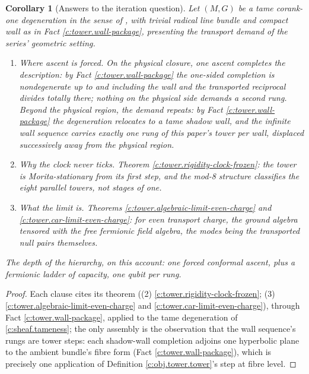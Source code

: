 \documentclass[11pt]{article}
\newtheorem{corollary}[theorem]{Corollary}
\theoremstyle{definition}
\theoremstyle{plain}
\newcommand{\changedmark}[2]{\marginpar{\raggedright\scriptsize\color{#1}#2}}
\begin{document}
\begin{corollary}[Answers to the iteration question]\label{c:tower.answers-iteration-question}
\changedmark{gray}{reworded}
Let $(M, G)$ be a tame corank-one degeneration in the sense of \cite[Hyp.~2.1]{ButlerT4}, with trivial radical line bundle and compact wall as in Fact \ref{c:tower.wall-package}, presenting the transport demand of the series' geometric setting.
\begin{enumerate}
\item \emph{Where ascent is forced.} On the physical closure, one ascent completes the description: by Fact \ref{c:tower.wall-package} the one-sided completion is nondegenerate up to and including the wall and the transported reciprocal divides totally there; nothing on the physical side demands a second rung. Beyond the physical region, the demand repeats: by Fact \ref{c:tower.wall-package} the degeneration relocates to a tame shadow wall, and the infinite wall sequence carries exactly one rung of this paper's tower per wall, displaced successively away from the physical region.
\item \emph{Why the clock never ticks.} Theorem \ref{c:tower.rigidity-clock-frozen}: the tower is Morita-stationary from its first step, and the mod-8 structure classifies the eight parallel towers, not stages of one.
\item \emph{What the limit is.} Theorems \ref{c:tower.algebraic-limit-even-charge} and \ref{c:tower.car-limit-even-charge}: for even transport charge, the ground algebra tensored with the free fermionic field algebra, the modes being the transported null pairs themselves.
\end{enumerate}
The depth of the hierarchy, on this account: one forced conformal ascent, plus a fermionic ladder of capacity, one qubit per rung.
\end{corollary}
\begin{proof}
Each clause cites its theorem ((2) \ref{c:tower.rigidity-clock-frozen}; (3) \ref{c:tower.algebraic-limit-even-charge} and \ref{c:tower.car-limit-even-charge}), through Fact \ref{c:tower.wall-package}, applied to the tame degeneration of \ref{c:sheaf.tameness}; the only assembly is the observation that the wall sequence's rungs are tower steps: each shadow-wall completion adjoins one hyperbolic plane to the ambient bundle's fibre form (Fact \ref{c:tower.wall-package}), which is precisely one application of Definition \ref{c:obj.tower.tower}'s step at fibre level.

\end{proof}
\end{document}
